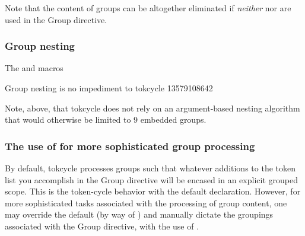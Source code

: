 \documentclass[10pt]{article}
\newcommand\TokCycle{\textsf{tokcycle}}
\begin{document}
Note that the content of groups can be altogether eliminated if 
  \textit{neither}  nor 
   are used in the Group directive.



\endgroup

\subsubsection{Group nesting}

\begingroup

\begin{exampleC}[]{The  and 
  macros}
\newcommand\restorecolor{\setcounter{colorindex}{100}}
\newcommand\reducecolor[1]{%
  \color{red!\thecolorindex!cyan}%
  \addtocounter{colorindex}{-#1}%
  \ifnum\thecolorindex<1\relax\setcounter{colorindex}{1}\fi}
\end{exampleC}

\begin{exampleA}[lefthand width=6cm]{Group nesting is no impediment to
  tokcycle}
\restorecolor
\tokcycle
  {}
  {%
   \addcytoks{[}%
   \addcytoks{]}}
  {}
  {}{%
  {1{{3{{5{{7{{9{1{}0}}8}}6}}4}}2}}}
\the\cytoks
\end{exampleA}
Note, above, that \TokCycle{} does not rely on an argument-based nesting
  algorithm that would otherwise be limited to 9 embedded groups.
\endgroup

\subsubsection{The use of  for more sophisticated
  group processing}

\begingroup

\begin{sloppypar}
By default, \TokCycle{} processes groups such that whatever additions to the
   token list you accomplish in the Group directive will be 
  encased in an explicit grouped scope.
This is the token-cycle behavior with the default  
  declaration.
However, for more sophisticated tasks associated with the processing of
  group content, one may override the default (by way of 
  ) and manually dictate the groupings associated 
  with the Group directive, with the use of .
\end{sloppypar}
\end{document}
